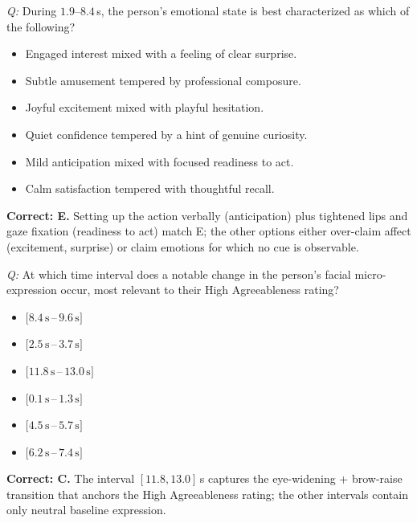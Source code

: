 \documentclass{llmxive}
\begin{document}
\begin{examplebox}[title={(4) Mixed Emotion Discrimination}]
\emph{Q:} During $1.9$--$8.4$\,s, the person's emotional state is best characterized as which of the following?
\begin{itemize}[leftmargin=1.4em, itemsep=0pt, topsep=1pt, parsep=0pt]
\item[A.] Engaged interest mixed with a feeling of clear surprise.
\item[B.] Subtle amusement tempered by professional composure.
\item[C.] Joyful excitement mixed with playful hesitation.
\item[D.] Quiet confidence tempered by a hint of genuine curiosity.
\item[E.] Mild anticipation mixed with focused readiness to act.
\item[F.] Calm satisfaction tempered with thoughtful recall.
\end{itemize}
\textbf{Correct: E.}  Setting up the action verbally (anticipation) plus tightened lips and gaze fixation (readiness to act) match E; the other options either over-claim affect (excitement, surprise) or claim emotions for which no cue is observable.

\end{examplebox}
\begin{examplebox}[title={(5) Micro-expression Localization}]
\emph{Q:} At which time interval does a notable change in the person's facial micro-expression occur, most relevant to their High Agreeableness rating?
\begin{itemize}[leftmargin=1.4em, itemsep=0pt, topsep=1pt, parsep=0pt]
\item[A.] $[8.4\,\text{s}\,$--$\,9.6\,\text{s}]$
\item[B.] $[2.5\,\text{s}\,$--$\,3.7\,\text{s}]$
\item[C.] $[11.8\,\text{s}\,$--$\,13.0\,\text{s}]$
\item[D.] $[0.1\,\text{s}\,$--$\,1.3\,\text{s}]$
\item[E.] $[4.5\,\text{s}\,$--$\,5.7\,\text{s}]$
\item[F.] $[6.2\,\text{s}\,$--$\,7.4\,\text{s}]$
\end{itemize}
\textbf{Correct: C.}  The interval $[11.8, 13.0]$\,s captures the eye-widening + brow-raise transition that anchors the High Agreeableness rating; the other intervals contain only neutral baseline expression.

\end{examplebox}
\end{document}
